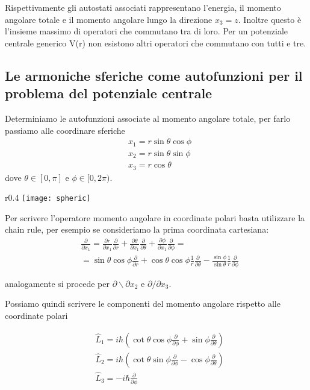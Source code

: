 Rispettivamente gli autostati associati rappresentano l'energia, il momento angolare totale e il momento angolare lungo la direzione $x_3 = z$. Inoltre questo \`e l'insieme massimo di operatori che commutano tra di loro. Per un potenziale centrale generico V(r) non esistono altri operatori che commutano con tutti e tre. 

\subsection{Le armoniche sferiche come autofunzioni per il problema del potenziale centrale}

Determiniamo le autofunzioni associate al momento angolare totale, per farlo passiamo alle coordinare sferiche
\begin{align*}
	& x_1 = r\sin{\theta}\cos \phi \\ 
	& x_2 = r\sin \theta \sin \phi \\ 
	& x_3 = r \cos \theta
\end{align*}
dove  $\theta \in [0,\pi]$ e $\phi \in [0,2\pi)$.

\begin{wrapfigure}{r}{0.4\textwidth}  %
    \centering
    \texttt{[image: spheric]}  %
\end{wrapfigure}

Per scrivere l'operatore momento angolare in coordinate polari basta utilizzare la chain rule, per esempio se consideriamo la prima coordinata cartesiana:
\begin{align*}
	& \frac{\partial}{\partial x_1} = \frac{\partial r}{\partial x_1}\frac{\partial}{\partial r} +\frac{\partial \theta}{\partial x_1}\frac{\partial }{\partial \theta} + \frac{\partial \phi}{\partial  x_1} \frac{\partial}{\partial \phi} = \\[0.4cm]
	& = \sin\theta \cos \phi \frac{\partial}{\partial r} + \cos\theta \cos \phi \frac{1}{r}\frac{\partial}{\partial \theta} - \frac{\sin \phi}{\sin \theta } \frac{1}{r} \frac{\partial}{\partial \phi}
\end{align*}

 analogamente si procede per $\partial \backslash \partial x_2$ e $\partial / \partial x_3$.
\newline

Possiamo quindi scrivere le componenti del momento angolare rispetto alle coordinate polari

\begin{equation}
\begin{aligned}
& \hat{L}_1=i \hbar\left(\cot \theta \cos \phi \frac{\partial}{\partial \phi}+\sin \phi \frac{\partial}{\partial \theta}\right) \\
& \hat{L}_2=i \hbar\left(\cot \theta \sin \phi \frac{\partial}{\partial \phi}-\cos \phi \frac{\partial}{\partial \theta}\right) \\
& \hat{L}_3=-i \hbar \frac{\partial}{\partial \phi}
\end{aligned}
\end{equation}

